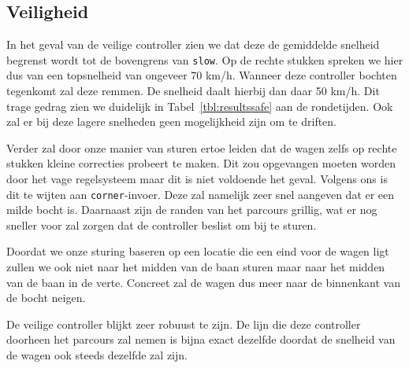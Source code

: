 \subsection{Veiligheid}

In het geval van de veilige controller zien we dat deze de gemiddelde snelheid 
begrenst wordt tot de bovengrens van \texttt{slow}. Op de rechte stukken 
spreken we hier dus van een topsnelheid van ongeveer 70 km/h. Wanneer deze 
controller bochten tegenkomt zal deze remmen. De snelheid daalt hierbij dan 
daar 50 km/h. Dit trage gedrag zien we duidelijk in Tabel~\ref{tbl:resultssafe} 
aan de rondetijden. Ook zal er bij deze lagere snelheden geen mogelijkheid zijn 
om te driften. 

Verder zal door onze manier van sturen ertoe leiden dat de wagen zelfs op rechte stukken kleine correcties probeert te maken. Dit zou opgevangen moeten worden door het vage regelsysteem maar dit is niet voldoende het geval. Volgens ons is dit te wijten aan \texttt{corner}-invoer. Deze zal namelijk zeer snel aangeven dat er een milde bocht is. Daarnaast zijn de randen van het parcours grillig, wat er nog sneller voor zal zorgen dat de controller beslist om bij te sturen.

Doordat we onze sturing baseren op een locatie die een eind voor de wagen ligt zullen we ook niet naar het midden van de baan sturen maar naar het midden van de baan in de verte. Concreet zal de wagen dus meer naar de binnenkant van de bocht neigen.

De veilige controller blijkt zeer robuust te zijn. De lijn die deze controller doorheen het parcours zal nemen is bijna exact dezelfde doordat de snelheid van de wagen ook steeds dezelfde zal zijn.